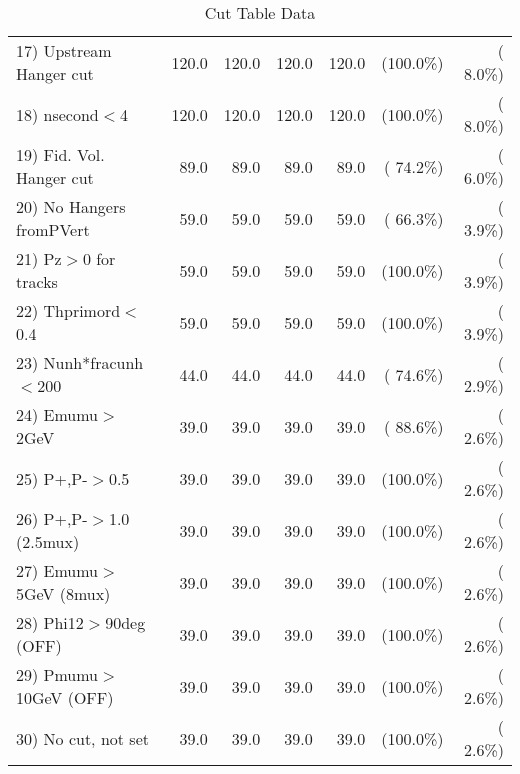 \begin{table}[h!]
\begin{tabular}{||l||r|r|r|r|r|r||}
 17) Upstream Hanger cut  &        120.0 &        120.0 &        120.0 &        120.0 & (100.0\%) & (  8.0\%) \\
 18) nsecond$<$4          &        120.0 &        120.0 &        120.0 &        120.0 & (100.0\%) & (  8.0\%) \\
 19) Fid. Vol. Hanger cut &         89.0 &         89.0 &         89.0 &         89.0 & ( 74.2\%) & (  6.0\%) \\
 20) No Hangers fromPVert &         59.0 &         59.0 &         59.0 &         59.0 & ( 66.3\%) & (  3.9\%) \\
 21) Pz$>$0 for tracks    &         59.0 &         59.0 &         59.0 &         59.0 & (100.0\%) & (  3.9\%) \\
 22) Thprimord$<$0.4      &         59.0 &         59.0 &         59.0 &         59.0 & (100.0\%) & (  3.9\%) \\
 23) Nunh*fracunh$<$200   &         44.0 &         44.0 &         44.0 &         44.0 & ( 74.6\%) & (  2.9\%) \\
 24) Emumu$>$2GeV         &         39.0 &         39.0 &         39.0 &         39.0 & ( 88.6\%) & (  2.6\%) \\
 25) P+,P-$>$0.5          &         39.0 &         39.0 &         39.0 &         39.0 & (100.0\%) & (  2.6\%) \\
 26) P+,P-$>$1.0 (2.5mux) &         39.0 &         39.0 &         39.0 &         39.0 & (100.0\%) & (  2.6\%) \\
 27) Emumu$>$5GeV  (8mux) &         39.0 &         39.0 &         39.0 &         39.0 & (100.0\%) & (  2.6\%) \\
 28) Phi12$>$90deg  (OFF) &         39.0 &         39.0 &         39.0 &         39.0 & (100.0\%) & (  2.6\%) \\
 29) Pmumu$>$10GeV  (OFF) &         39.0 &         39.0 &         39.0 &         39.0 & (100.0\%) & (  2.6\%) \\
 30) No cut, not set      &         39.0 &         39.0 &         39.0 &         39.0 & (100.0\%) & (  2.6\%) \\
 \hline
 \hline
 \end{tabular}
 \caption{Cut Table  Data     }
 \label{tab-cutcohjpsi-mumu_data}
 \end{table}
